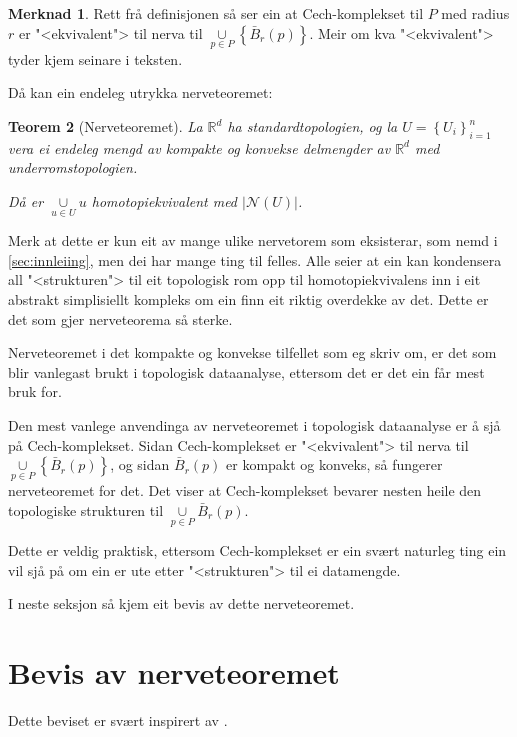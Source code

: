 \documentclass[a4paper, 12pt, norsk]{article}
\theoremstyle{plain}
\newtheorem{theorem}{Teorem}[section]
\theoremstyle{definition}
\newtheorem{remark}[theorem]{Merknad}
\newcommand{\Rb}{\mathbb{R}}
\newcommand{\Nc}{\mathcal{N}}
\newcommand{\union}{ \mathop{\cup}\limits }
\newcommand{\gr}[1]{ \lvert #1 \rvert } %
\newcommand{\set}[1]{ \left\{ #1 \right\} } %
\begin{document}
\begin{remark} \label{rem:cech-ekvivalent}
	Rett frå definisjonen så ser ein at Cech-komplekset til $P$ med radius $r$ er "<ekvivalent"> til nerva til $\union_{p \in P} \left \{ \bar{B}_r(p) \right \}$. Meir om kva "<ekvivalent"> tyder kjem seinare i teksten.
\end{remark}

Då kan ein endeleg utrykka nerveteoremet:

\begin{theorem}[Nerveteoremet] \label{thm:nerveteoremet}
	La \( \Rb^d \) ha standardtopologien, og la \( U = \set{U_i}_{i=1}^n \) vera ei endeleg mengd av kompakte og konvekse delmengder av \( \Rb^d \) med underromstopologien.
	
	Då er \( \union_{u \in U} u \) homotopiekvivalent med \( \gr{\Nc(U)} \).
\end{theorem}

Merk at dette er kun eit av mange ulike nervetorem som eksisterar, som nemd i \autoref{sec:innleiing}, men dei har mange ting til felles. Alle seier at ein kan kondensera all "<strukturen"> til eit topologisk rom opp til homotopiekvivalens inn i eit abstrakt simplisiellt kompleks om ein finn eit riktig overdekke av det. Dette er det som gjer nerveteorema så sterke.

Nerveteoremet i det kompakte og konvekse tilfellet som eg skriv om, er det som blir vanlegast brukt i topologisk dataanalyse, ettersom det er det ein får mest bruk for.

Den mest vanlege anvendinga av nerveteoremet i topologisk dataanalyse er å sjå på Cech-komplekset. Sidan Cech-komplekset er "<ekvivalent"> til nerva til \( \union_{p \in P} \left \{ \bar{B}_r(p) \right \} \), og sidan \( \bar{B}_r(p) \) er kompakt og konveks, så fungerer nerveteoremet for det. Det viser at Cech-komplekset bevarer nesten heile den topologiske strukturen til \( \union_{p \in P} \bar{B}_r(p) \).

Dette er veldig praktisk, ettersom Cech-komplekset er ein svært naturleg ting ein vil sjå på om ein er ute etter "<strukturen"> til ei datamengde.

I neste seksjon så kjem eit bevis av dette nerveteoremet.

\section{Bevis av nerveteoremet}

Dette beviset er svært inspirert av \cite[Section 3]{https://doi.org/10.48550/arxiv.2203.03571}.
\end{document}
